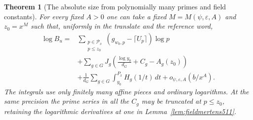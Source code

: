 \documentclass[a4paper,11pt]{article}
\newtheorem{theorem}[proposition]{Theorem}
\theoremstyle{definition}
\theoremstyle{remark}
\numberwithin{equation}{section}
\begin{document}
\begin{theorem}[The absolute size from polynomially many primes and field constants]\leavevmode
\label{thm:divtail511}
For every fixed \(A>0\) one can take a fixed \(M=M(\psi,\varepsilon,A)\)
and \(z_0=x^M\) such that, uniformly in the translate and the
reference word,
\[
 \begin{aligned}
 \log B_u
   ={}&\sum_{\substack{p\in\mathcal P_x\\p\le z_0}}
             (g_{w_0,p}-\lceil U_p\rceil)\log p\\
      &+\sum_{g\in G}J_g
                \left(\frac{\log y_0}{d_G}+C_g-A_g(z_0)\right)\\
      &+\frac1{d_G}\sum_{g\in G}
                           \int_{y_0}^{P_x} H_g(1/t)\,dt
                         +o_{\psi,\varepsilon,A}(b/x^A).
 \end{aligned}
\]
The integrals use only finitely many affine pieces and ordinary
logarithms. At the same precision the prime series in all the
\(C_g\) may be truncated at \(p\le z_0\), retaining the
logarithmic derivatives at one in Lemma~\ref{lem:fieldmertens511}.
\end{theorem}
\end{document}
